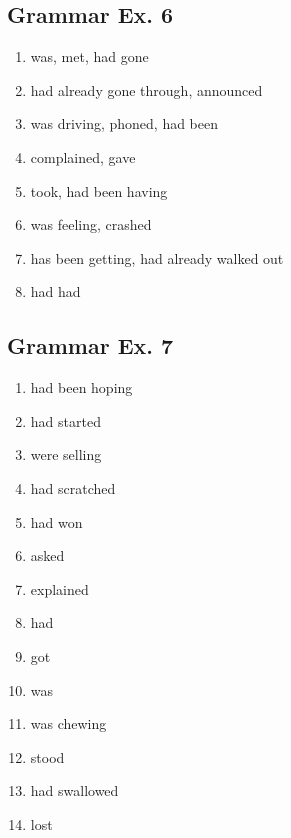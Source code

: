 \documentclass[12pt, a4paper, oneside]{article}
\begin{document}
  \subsection{Grammar Ex. 6}
  \begin{enumerate}[1.]
    \item was, met, had gone
    \item had already gone through, announced
    \item was driving, phoned, had been
    \item complained, gave
    \item took, had been having
    \item was feeling, crashed
    \item has been getting, had already walked out
    \item had had
  \end{enumerate}

  \subsection{Grammar Ex. 7}
  \begin{enumerate}[1.]
    \item had been hoping
    \item had started
    \item were selling
    \item had scratched
    \item had won
    \item asked
    \item explained
    \item had
    \item got
    \item was
    \item was chewing
    \item stood
    \item had swallowed
    \item lost
  \end{enumerate}
  
\end{document}
